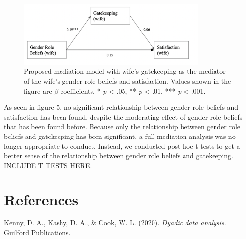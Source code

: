 \documentclass[
  man,floatsintext]{apa6}
\newlength{\cslhangindent}
\newlength{\cslentryspacingunit} %
\newenvironment{CSLReferences}[2] %
 {%
  \setlength{\parindent}{0pt}
  \ifodd #1
  \let\oldpar\par
  \def\par{\hangindent=\cslhangindent\oldpar}
  \fi
  \setlength{\parskip}{#2\cslentryspacingunit}
 }%
 {}
\begin{document}
\begin{figure}
\includegraphics[width=3.69in]{mediation} \caption{Proposed mediation model with wife's gatekeeping as the mediator of the wife's gender role beliefs and satisfaction. Values shown in the figure are \(\beta\) coefficients.
* \emph{p} \textless{} .05, ** \emph{p} \textless{} .01, *** \emph{p} \textless{} .001.}\label{fig:unnamed-chunk-18}
\end{figure}

As seen in figure 5, no significant relationship between gender role beliefs and satisfaction has been found, despite the moderating effect of gender role beliefs that has been found before. Because only the relationship between gender role beliefs and gatekeeping has been significant, a full mediation analysis was no longer appropriate to conduct.
Instead, we conducted post-hoc t tests to get a better sense of the relationship between gender role beliefs and gatekeeping. INCLUDE T TESTS HERE.

\hypertarget{references}{%
\section{References}\label{references}}

\hypertarget{refs}{}
\begin{CSLReferences}{1}{0}
\leavevmode{}%
Kenny, D. A., Kashy, D. A., \& Cook, W. L. (2020). \emph{Dyadic data analysis}. Guilford Publications.

\end{CSLReferences}


\clearpage
\renewcommand{\listfigurename}{Figure captions}

\clearpage
\renewcommand{\listtablename}{Table captions}
\end{document}
